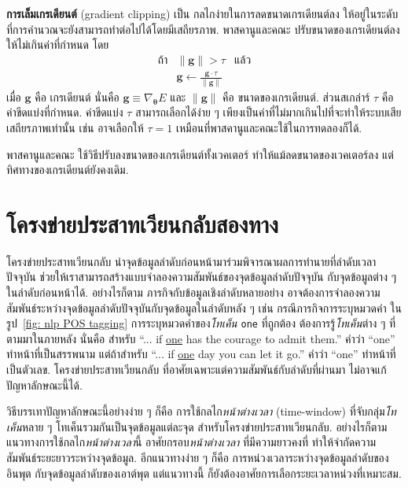 \textbf{การเล็มเกรเดียนต์} (gradient clipping)
เป็น กลไกง่ายในการลดขนาดเกรเดียนต์ลง ให้อยู่ในระดับที่การคำนวณจะยังสามารถทำต่อไปได้โดยมีเสถียรภาพ.
พาสคานูและคณะ\cite{PascanuEtAl2013} ปรับขนาดของเกรเดียนต์ลงให้ไม่เกินค่าที่กำหนด
โดย
%
\begin{eqnarray}
\mbox{ถ้า} & \| \bm{g} \| > \tau & \mbox{แล้ว}
\nonumber \\
          & \bm{g} \leftarrow \frac{\bm{g} \cdot \tau}{ \| \bm{g} \|} &
\label{eq: gradient clipping} 
\end{eqnarray}
เมื่อ $\bm{g}$ คือ เกรเดียนต์ นั่นคือ $\bm{g} \equiv \nabla_{\bm{\theta}} E$
และ $\| \bm{g} \|$ คือ ขนาดของเกรเดียนต์.
ส่วนสเกล่าร์ $\tau$ คือ ค่าขีดแบ่งที่กำหนด.
ค่าขีดแบ่ง $\tau$ สามารถเลือกได้ง่าย ๆ เพียงเป็นค่าที่ไม่มากเกินไปที่จะทำให้ระบบเสียเสถียรภาพเท่านั้น
เช่น อาจเลือกให้ $\tau = 1$ เหมือนที่พาสคานูและคณะใช้ในการทดลองก็ได้.

พาสคานูและคณะ ใช้วิธีปรับลงขนาดของเกรเดียนต์ทั้งเวคเตอร์ ทำให้แม้ลดขนาดของเวคเตอร์ลง แต่ทิศทางของเกรเดียนต์ยังคงเดิม.


\section{โครงข่ายประสาทเวียนกลับสองทาง}
\label{sec: bi-RNN}

โครงข่ายประสาทเวียนกลับ นำจุดข้อมูลลำดับก่อนหน้ามาร่วมพิจารณาผลการทำนายที่ลำดับเวลาปัจจุบัน
ช่วยให้เราสามารถสร้างแบบจำลองความสัมพันธ์ของจุดข้อมูลลำดับปัจจุบัน กับจุดข้อมูลต่าง ๆ ในลำดับก่อนหน้าได้.
อย่างไรก็ตาม ภารกิจกับข้อมูลเชิงลำดับหลายอย่าง อาจต้องการจำลองความสัมพันธ์ระหว่างจุดข้อมูลลำดับปัจจุบันกับจุดข้อมูลในลำดับหลัง ๆ
เช่น กรณีภารกิจการระบุหมวดคำ ในรูป~\ref{fig: nlp POS tagging} 
การระบุหมวดคำของ\textit{โทเค็น} \texttt{one} ที่ถูกต้อง ต้องการรู้\textit{โทเค็น}ต่าง ๆ ที่ตามมาในภายหลัง
นั่นคือ
สำหรับ ``... if \underline{one} has the courage to admit them.''
คำว่า ``one'' ทำหน้าที่เป็นสรรพนาม
แต่ถ้าสำหรับ 
``... if \underline{one} day you can let it go.''
คำว่า ``one'' ทำหน้าที่เป็นตัวเลข.
โครงข่ายประสาทเวียนกลับ ที่อาศัยเฉพาะแต่ความสัมพันธ์กับลำดับที่ผ่านมา ไม่อาจแก้ปัญหาลักษณะนี้ได้.

วิธีบรรเทาปัญหาลักษณะนี้อย่างง่าย ๆ ก็คือ การใช้กลไก\textit{หน้าต่างเวลา} (time-window)
ที่จับกลุ่ม\textit{โทเค็น}หลาย ๆ โทเค็นรวมกันเป็นจุดข้อมูลแต่ละจุด สำหรับโครงข่ายประสาทเวียนกลับ.
อย่างไรก็ตาม แนวทางการใช้กลไก\textit{หน้าต่างเวลา}นี้
อาศัยกรอบ\textit{หน้าต่างเวลา} ที่มีความยาวคงที่ ทำให้จำกัดความสัมพันธ์ระยะยาวระหว่างจุดข้อมูล.
อีกแนวทางง่าย ๆ ก็คือ การหน่วงเวลาระหว่างจุดข้อมูลลำดับของอินพุต กับจุดข้อมูลลำดับของเอาต์พุต
แต่แนวทางนี้ ก็ยังต้องอาศัยการเลือกระยะเวลาหน่วงที่เหมาะสม.


